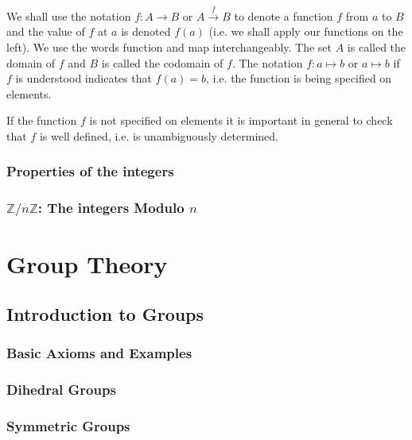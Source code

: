 \documentclass[cn,11pt,chinese]{elegantbook}
\numberwithin{equation}{section}
\begin{document}
We shall use the notation $f: A \to B$ or $A \stackrel{f}{\rightarrow} B$ to denote a function $f$ from $a$ to $B$ and the value of $f$ at $a$ is denoted $f(a)$ (i.e. we shall apply our functions on the left). We use the words function and map interchangeably. The set $A$ is called the domain of $f$ and $B$ is called the codomain of $f$. The notation $f: a \mapsto b$ or $a \mapsto b$ if $f$ is understood indicates that $f(a)=b$, i.e. the function is being specified on elements.

If the function $f$ is not specified on elements it is important in general to check that $f$ is well defined, i.e. is unambiguously determined.

\section{Properties of the integers}\label{section00002}



\section{$\mathbb{Z}/n\mathbb{Z}$: The integers Modulo $n$}\label{section00003}


\tableofcontents
\mainmatter
\hypersetup{pageanchor=true}

\part{Group Theory}
\chapter{Introduction to Groups}\label{chapter001}
\section{Basic Axioms and Examples}\label{section00101}


\section{Dihedral Groups}\label{section00102}



\section{Symmetric Groups}\label{section00103}
\end{document}
